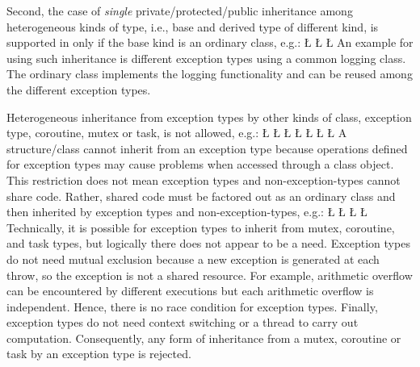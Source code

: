 \documentclass[openright,twoside]{report}
\begin{document}
Second, the case of \emph{single} private/protected/public inheritance among heterogeneous kinds of type, i.e., base and derived type of different kind, is supported in \uC only if the base kind is an ordinary class, e.g.:
\LGinlinefalse\LGbegin\lgrinde
\L{}
\CE{}\L{\LB{}}
\L{}
\CE{}\endlgrinde\LGend
An example for using such inheritance is different exception types using a common logging class.
The ordinary class implements the logging functionality and can be reused among the different exception types.

Heterogeneous inheritance from exception types by other kinds of class, exception type, coroutine, mutex or task, is not allowed, e.g.:
\LGinlinefalse\LGbegin\lgrinde
\L{}
\L{\LB{}}
\L{}
\CE{}\L{}
\CE{}\L{}
\CE{}\L{}
\CE{}\L{}
\CE{}\endlgrinde\LGend
A structure/class cannot inherit from an exception type because operations defined for exception types may cause problems when accessed through a class object.
This restriction does not mean exception types and non-exception-types cannot share code.
Rather, shared code must be factored out as an ordinary class and then inherited by exception types and non-exception-types, e.g.:
\LGinlinefalse\LGbegin\lgrinde
\L{}
\L{\LB{}}
\L{}
\L{}
\endlgrinde\LGend
Technically, it is possible for exception types to inherit from mutex, coroutine, and task types, but logically there does not appear to be a need.
Exception types do not need mutual exclusion because a new exception is generated at each throw, so the exception is not a shared resource.
For example, arithmetic overflow can be encountered by different executions but each arithmetic overflow is independent.
Hence, there is no race condition for exception types.
Finally, exception types do not need context switching or a thread to carry out computation.
Consequently, any form of inheritance from a mutex, coroutine or task by an exception type is rejected.
\end{document}
